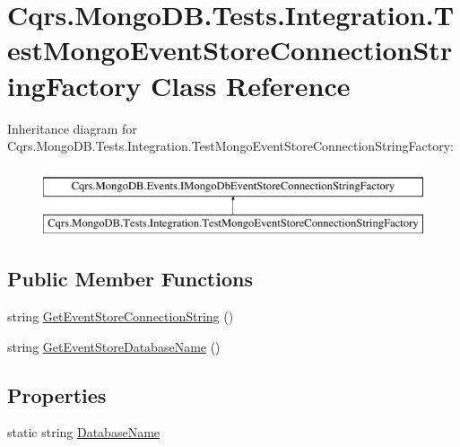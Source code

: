 \hypertarget{classCqrs_1_1MongoDB_1_1Tests_1_1Integration_1_1TestMongoEventStoreConnectionStringFactory}{}\section{Cqrs.\+Mongo\+D\+B.\+Tests.\+Integration.\+Test\+Mongo\+Event\+Store\+Connection\+String\+Factory Class Reference}
\label{classCqrs_1_1MongoDB_1_1Tests_1_1Integration_1_1TestMongoEventStoreConnectionStringFactory}
Inheritance diagram for Cqrs.\+Mongo\+D\+B.\+Tests.\+Integration.\+Test\+Mongo\+Event\+Store\+Connection\+String\+Factory\+:\begin{figure}[H]
\begin{center}
\leavevmode
\includegraphics[height=2.000000cm]{classCqrs_1_1MongoDB_1_1Tests_1_1Integration_1_1TestMongoEventStoreConnectionStringFactory}
\end{center}
\end{figure}
\subsection*{Public Member Functions}
\begin{DoxyCompactItemize}
\item 
string \hyperlink{classCqrs_1_1MongoDB_1_1Tests_1_1Integration_1_1TestMongoEventStoreConnectionStringFactory_a73b68d1160bae4e92bed4445303d6a8f}{Get\+Event\+Store\+Connection\+String} ()
\item 
string \hyperlink{classCqrs_1_1MongoDB_1_1Tests_1_1Integration_1_1TestMongoEventStoreConnectionStringFactory_adbefedfb3bea3521f72333ce47575301}{Get\+Event\+Store\+Database\+Name} ()
\end{DoxyCompactItemize}
\subsection*{Properties}
\begin{DoxyCompactItemize}
\item 
static string \hyperlink{classCqrs_1_1MongoDB_1_1Tests_1_1Integration_1_1TestMongoEventStoreConnectionStringFactory_a647bfdbf4eef2cffe60f86e3ac01efac}{Database\+Name}
\end{DoxyCompactItemize}


